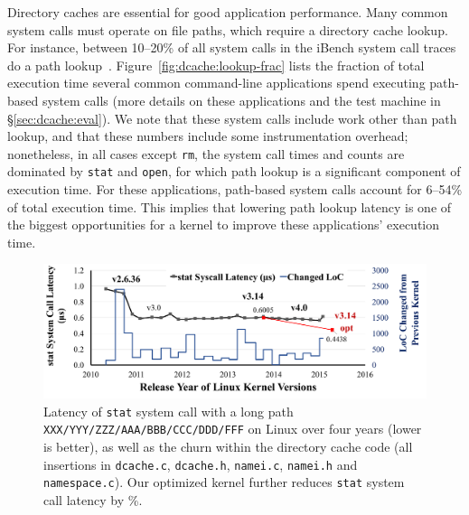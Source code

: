 Directory caches are essential for good application performance.
Many common system calls must operate on file paths,
which require a directory cache lookup.
For instance, between 10--20\% of all system calls in the iBench system call traces do a path lookup~\citep{filenotafile}. 
Figure~\ref{fig:dcache:lookup-frac} lists the fraction of total execution time
several common command-line applications spend executing path-based system calls
(more details on these applications and the test machine in \S\ref{sec:dcache:eval}).
We note that these system calls include work other than path lookup,
and that these numbers include some instrumentation overhead;
nonetheless, in all cases except {\tt rm},
the system call times and counts are dominated by
{\tt stat} and {\tt open}, for which 
path lookup is a significant component of execution time.
For these applications, path-based system calls account for 6--54\% of total execution time.
This implies that
lowering path lookup latency is
 one of the  biggest 
opportunities for a kernel to improve these applications' execution time.




\begin{figure}[t!]
\centering
\includegraphics[width=6in]{dcache/plots/latency-by-version.pdf}
\footnotesize
\caption[Lantecy of {\tt stat} system call over years.]
{Latency of {\tt stat} system call with a long path {\tt XXX/YYY/ZZZ/AAA/BBB/CCC/DDD/FFF} on Linux over four years (lower is better), as well as the churn within the directory cache code (all insertions in {\tt dcache.c}, {\tt dcache.h}, {\tt namei.c}, {\tt namei.h} and {\tt namespace.c}). 
Our optimized \linuxver{} kernel 
further reduces {\tt stat} system call latency by \statspeedup{}\%.}
\label{fig:dcache:by-version}
\end{figure}


